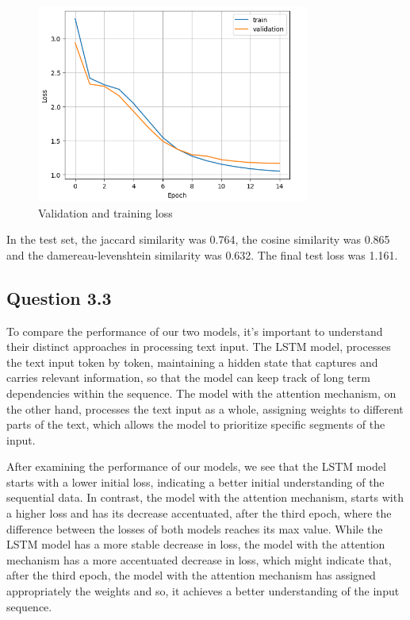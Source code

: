 \documentclass{article}
\begin{document}
\begin{figure}[H]
    \centering
    \includegraphics[width=0.8\textwidth]{../report/plots/Transformer-valid-train-loss.png}
    \caption{Validation and training loss}
    \label{fig:transformer-valid-train-loss}
\end{figure}


In the test set, the jaccard similarity was 0.764, the cosine similarity was 0.865 and the damereau-levenshtein similarity was 0.632. The final test loss was 1.161.

\subsection{Question 3.3}
To compare the performance of our two models, it's important to understand
their distinct approaches in processing text input. The LSTM model, processes the text input
token by token, maintaining a hidden state that captures and carries relevant 
information, so that the model can keep track of long term dependencies within
the sequence. The model with the attention mechanism, on the other hand, processes 
the text input as a whole, assigning weights to different parts of the text, 
which allows the model to prioritize specific segments of the input.

After examining the performance of our models, we see that the LSTM model starts 
with a  lower initial loss, indicating a better initial understanding of the 
sequential data. In contrast, the model with the attention mechanism, 
starts with a higher loss and has its decrease accentuated, after the third epoch,
where the difference between the losses of both models reaches its max value. 
While the LSTM model has a more stable decrease in loss, the model with the
attention mechanism has a more accentuated decrease in loss, which might indicate
that, after the third epoch, the model with the attention mechanism has assigned 
appropriately the weights and so, it achieves a better understanding of the input
sequence.
\end{document}
